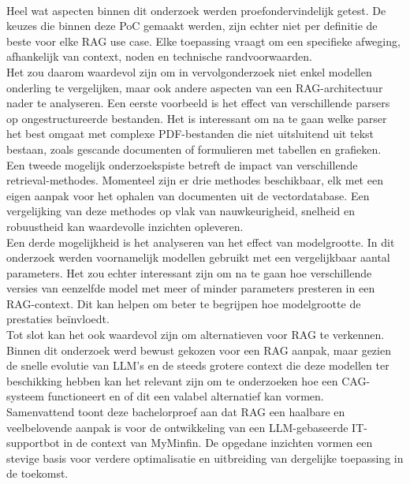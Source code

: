 \\[1em]
Heel wat aspecten binnen dit onderzoek werden proefondervindelijk getest. De keuzes die binnen deze PoC gemaakt werden, zijn echter niet per definitie de beste voor elke RAG use case. Elke toepassing vraagt om een specifieke afweging, afhankelijk van context, noden en technische randvoorwaarden.
\\[1em]
Het zou daarom waardevol zijn om in vervolgonderzoek niet enkel modellen onderling te vergelijken, maar ook andere aspecten van een RAG-architectuur nader te analyseren. Een eerste voorbeeld is het effect van verschillende parsers op ongestructureerde bestanden. Het is interessant om na te gaan welke parser het best omgaat met complexe PDF-bestanden die niet uitsluitend uit tekst bestaan, zoals gescande documenten of formulieren met tabellen en grafieken.
\\[1em]
Een tweede mogelijk onderzoekspiste betreft de impact van verschillende retrieval-methodes. Momenteel zijn er drie methodes beschikbaar, elk met een eigen aanpak voor het ophalen van documenten uit de vectordatabase. Een vergelijking van deze methodes op vlak van nauwkeurigheid, snelheid en robuustheid kan waardevolle inzichten opleveren.
\\[1em]
Een derde mogelijkheid is het analyseren van het effect van modelgrootte. In dit onderzoek werden voornamelijk modellen gebruikt met een vergelijkbaar aantal parameters. Het zou echter interessant zijn om na te gaan hoe verschillende versies van eenzelfde model met meer of minder parameters presteren in een RAG-context. Dit kan helpen om beter te begrijpen hoe modelgrootte de prestaties beïnvloedt.
\\[1em]
Tot slot kan het ook waardevol zijn om alternatieven voor RAG te verkennen. Binnen dit onderzoek werd bewust gekozen voor een RAG aanpak, maar gezien de snelle evolutie van LLM's en de steeds grotere context die deze modellen ter beschikking hebben kan het relevant zijn om te onderzoeken hoe een CAG-systeem functioneert en of dit een valabel alternatief kan vormen.
\\[1em]
Samenvattend toont deze bachelorproef aan dat RAG een haalbare en veelbelovende aanpak is voor de ontwikkeling van een LLM-gebaseerde IT-supportbot in de context van MyMinfin. De opgedane inzichten vormen een stevige basis voor verdere optimalisatie en uitbreiding van dergelijke toepassing in de toekomst.